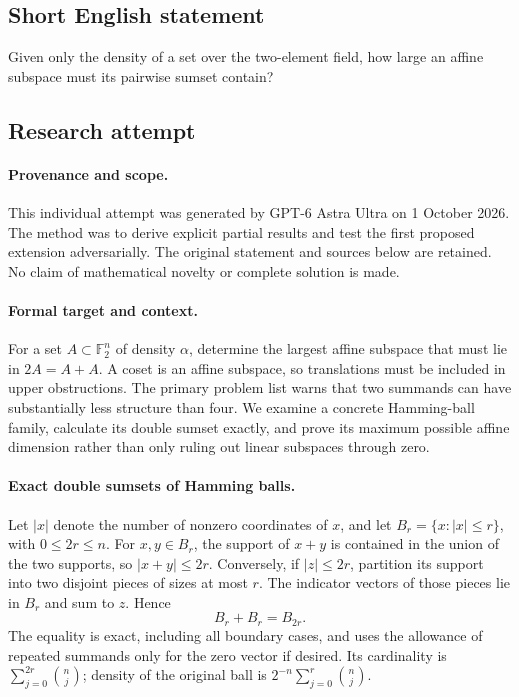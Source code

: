 \documentclass[11pt,a4paper]{article}
\newcommand{\F}{\mathbb{F}}
\begin{document}
\subsection{Short English statement}

Given only the density of a set over the two-element field, how large an affine subspace must its pairwise sumset contain?

\subsection{Research attempt}

\paragraph{Provenance and scope.}
This individual attempt was generated by GPT-6 Astra Ultra on 1 October 2026. The method was to derive explicit partial results and test the first proposed extension adversarially. The original statement and sources below are retained. No claim of mathematical novelty or complete solution is made.

\paragraph{Formal target and context.}
For a set $A\subset\F_2^n$ of density $\alpha$, determine the largest affine subspace that must lie in $2A=A+A$. A coset is an affine subspace, so translations must be included in upper obstructions. The primary problem list warns that two summands can have substantially less structure than four. We examine a concrete Hamming-ball family, calculate its double sumset exactly, and prove its maximum possible affine dimension rather than only ruling out linear subspaces through zero.

\paragraph{Exact double sumsets of Hamming balls.}
Let $|x|$ denote the number of nonzero coordinates of $x$, and let $B_r=\{x:|x|\leq r\}$, with $0\leq2r\leq n$. For $x,y\in B_r$, the support of $x+y$ is contained in the union of the two supports, so $|x+y|\leq2r$. Conversely, if $|z|\leq2r$, partition its support into two disjoint pieces of sizes at most $r$. The indicator vectors of those pieces lie in $B_r$ and sum to $z$. Hence
\[
 B_r+B_r=B_{2r}.
\]
The equality is exact, including all boundary cases, and uses the allowance of repeated summands only for the zero vector if desired. Its cardinality is $\sum_{j=0}^{2r}\binom nj$; density of the original ball is $2^{-n}\sum_{j=0}^r\binom nj$.
\end{document}

